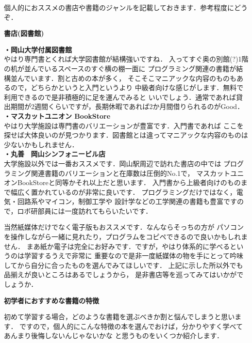 \documentclass[autodetect-engine,dvi=dvipdfmx,ja=standard,a4j,12pt]{bxjsarticle}
\begin{document}
個人的におススメの書店や書籍のジャンルを記載しておきます．参考程度にどうぞ．
\begin{center}
    {\Large \textbf{書店(図書館)}}
\end{center}
\begin{boxnote}
{\large \textbf{・岡山大学付属図書館}} \\
やはり専門書とくれば大学図書館が結構強いですね．
入ってすぐ奥の別館(?)1階の机が並んでいるスペースのすぐ横の棚一面に
プログラミング関連の書籍が結構並んでいます．割と古めの本が多く，
そこそこマニアックな内容のものもあるので，どちらかというと入門というより
中級者向けな感じがします．無料で利用できるので是非積極的に足を運んでみると
いいでしょう．通常であれば貸出期間が2週間くらいですが，長期休暇であれば2か月間借りられるのがGood．\\

{\large \textbf{・マスカットユニオン BookStore}} \\
やはり大学施設は専門書のバリエーションが豊富です．入門書であれば
ここを探せば大体良いのが見つかります．図書館とは違ってマニアックな内容のものは少ないかもしれません．\\

{\large \textbf{・丸善 \ 岡山シンフォニービル店}} \\
大学施設以外では一番おススメです．岡山駅周辺で訪れた書店の中では
プログラミング関連書籍のバリエーションと在庫数は圧倒的No.1で，
マスカットユニオンBookStoreと同等かそれ以上だと思います．
入門書から上級者向けのものまで幅広く置かれているのが非常に良いです．
プログラミングだけではなく，電気・回路系やマイコン，制御工学や
設計学などの工学関連の書籍も豊富ですので，ロボ研部員には一度訪れてもらいたいです．

\end{boxnote}
当然紙媒体だけでなく電子版もおススメです．なんならそっちの方が
パソコンを操作しながら一緒に見れたり，プログラムをコピペできるので良いかもしれません．
まあ紙か電子は完全にお好みです．ですが，やはり体系的に学べるというのは学習するうえで非常に
重要なので是非一度紙媒体の物を手にとって吟味してから自分に合ったものを選んでみてほしいです．
上記に示した所以外でも品揃えが良いところはあるでしょうから，
是非書店等を巡ってみてはいかがでしょうか．

\begin{center}
    {\Large \textbf{初学者におすすめな書籍の特徴}} \\
\end{center}
初めて学習する場合，どのような書籍を選ぶべきか割と悩んでしまうと思います．
ですので，個人的にこんな特徴の本を選んでおけば，分かりやすく学べてあんまり後悔しないんじゃないかな
と思うものをいくつか紹介します． 
\end{document}

